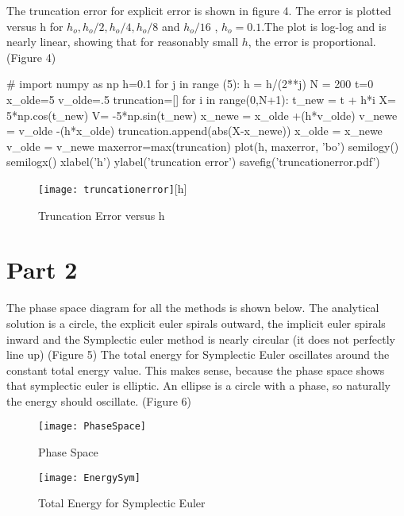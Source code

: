 \documentclass{article}
\begin{document}
The truncation error for explicit error is shown in figure 4. The error is plotted versus h for $h_o, h_o/2, h_o/4, h_o/8$ and $ h_o/16$ , $h_o=0.1$.The plot is log-log and is nearly linear, showing that for reasonably small $h$, the error is proportional. (Figure 4)




\begin{pylabcode}[secondsession]
#
import numpy as np
h=0.1
for j in range (5):
	h = h/(2**j)
	N = 200
	t=0
	x_olde=5
	v_olde=.5
	truncation=[]
	for i in range(0,N+1): 
		t_new = t + h*i
		X= 5*np.cos(t_new)
		V= -5*np.sin(t_new)
		x_newe = x_olde +(h*v_olde)
		v_newe = v_olde -(h*x_olde)
		truncation.append(abs(X-x_newe))
       		x_olde = x_newe
       		v_olde = v_newe
	maxerror=max(truncation)
	plot(h, maxerror, 'bo')   
semilogy()
semilogx()
xlabel('h')
ylabel('truncation error')
savefig('truncationerror.pdf') 
\end{pylabcode}
\begin{figure}
\texttt{[image: truncationerror]}[h]
\caption{Truncation Error versus h}
\end{figure}
\section{Part 2}

The phase space diagram for all the methods is shown below. The analytical solution is a circle, the explicit euler spirals outward, the implicit euler spirals inward and the Symplectic euler method is nearly circular (it does not perfectly line up) (Figure 5)
The total energy for Symplectic Euler oscillates around the constant total energy value. This makes sense, because the phase space shows that symplectic euler is elliptic. An ellipse is a circle with a phase, so naturally the energy should oscillate. (Figure 6)

\begin{figure}
\texttt{[image: PhaseSpace]}
\caption{Phase Space}
\end{figure}
\begin{figure}
\texttt{[image: EnergySym]}
\caption{Total Energy for Symplectic Euler}
\end{figure}
\end{document}
